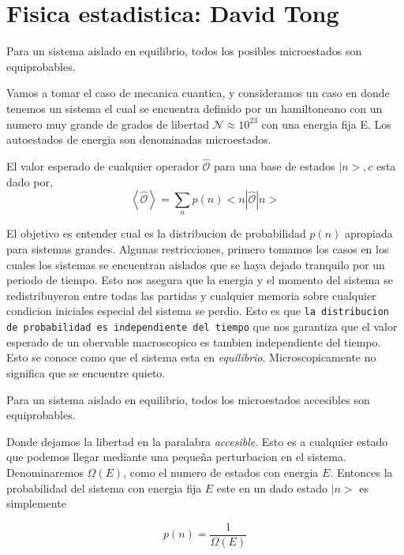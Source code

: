 \documentclass[20pt]{extarticle}
\newcommand{\N}{\mathcal{N}}
\begin{document}
\section{Fisica estadistica: David Tong}
\begin{mdframed}[backgroundcolor=frenchblue!20]
Para un sistema aislado en equilibrio, todos los posibles microestados son equiprobables.
\end{mdframed}

Vamos a tomar el caso de mecanica cuantica, y consideramos un caso en donde tenemos un sistema el cual se encuentra definido por un hamiltoneano con un numero muy grande de grados de libertad $\N\approx 10^{23}$ con una energia fija E.
Los autoestados de energia son denominadas microestados.

El valor esperado de cualquier operador $\hat{\mathcal{O}}$ para una base de estados $|n>,c$ esta dado por,
\begin{equation}
	\left< \hat{\mathcal{O}}\right> = \sum_np(n)<n|\hat{\mathcal{O}}|n>
\end{equation}

El objetivo es entender cual es la distribucion de probabilidad $p(n)$ apropiada para sistemas grandes.
Algunas restricciones, primero tomamos los casos en los cuales los sistemas se encuentran aislados que se haya dejado tranquilo por un periodo de tiempo.
Esto nos asegura que la energia y el momento del sistema se redistribuyeron entre todas las partidas y cualquier memoria sobre cualquier condicion iniciales especial del sistema se perdio.
Esto es que \texttt{la distribucion de probabilidad es independiente del tiempo} que nos garantiza que el valor esperado de un obervable macroscopico es tambien independiente del tiempo.
Esto se conoce como que el sistema esta en \textit{equilibrio}.
Microscopicamente no significa que se encuentre quieto.

\begin{mdframed}[backgroundcolor=frenchblue!20]
Para un sistema aislado en equilibrio, todos los microestados accesibles son equiprobables.
\end{mdframed}

Donde dejamos la libertad en la paralabra \textit{accesible}.
Esto es a cualquier estado que podemos llegar mediante una peque\~na perturbacion en el sistema.
Denominaremos $\Omega(E)$, como el numero de estados con energia $E$.
Entonces la probabilidad del sistema con energia fija $E$ este en un dado estado $|n>$ es simplemente

\begin{equation}
	p(n) = \frac{1}{\Omega(E)}
\end{equation}
\end{document}
